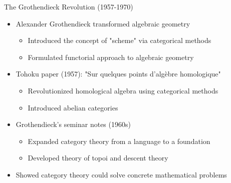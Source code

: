 \documentclass{beamer}
\begin{document}
\begin{frame}{The Grothendieck Revolution (1957-1970)}
    \begin{itemize}
        \item Alexander Grothendieck transformed algebraic geometry
            \begin{itemize}
                \item Introduced the concept of "scheme" via categorical methods
                \item Formulated functorial approach to algebraic geometry
            \end{itemize}
        \item Tohoku paper (1957): "Sur quelques points d'algèbre homologique"
            \begin{itemize}
                \item Revolutionized homological algebra using categorical methods
                \item Introduced abelian categories
            \end{itemize}
        \item Grothendieck's seminar notes (1960s)
            \begin{itemize}
                \item Expanded category theory from a language to a foundation
                \item Developed theory of topoi and descent theory
            \end{itemize}
        \item Showed category theory could solve concrete mathematical problems
    \end{itemize}
\end{frame}
\end{document}
